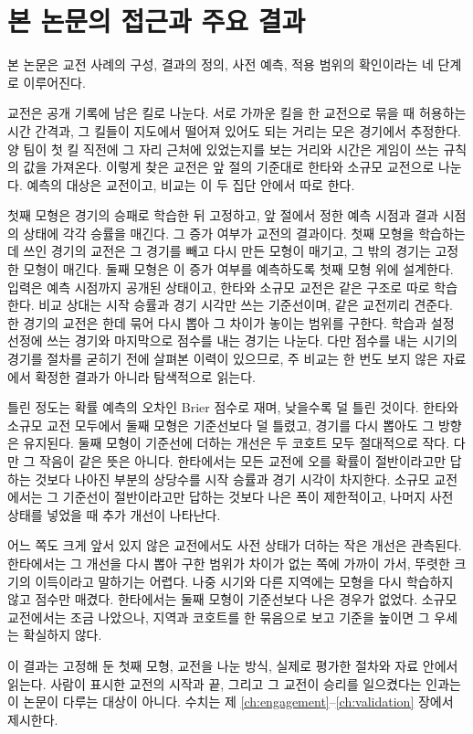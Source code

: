 \section{본 논문의 접근과 주요 결과}
\label{sec:intro-approach}

본 논문은 교전 사례의 구성, 결과의 정의, 사전 예측, 적용 범위의 확인이라는 네 단계로 이루어진다.

교전은 공개 기록에 남은 킬로 나눈다. 서로 가까운 킬을 한 교전으로 묶을 때 허용하는 시간 간격과, 그 킬들이 지도에서 떨어져 있어도 되는 거리는 모은 경기에서 추정한다. 양 팀이 첫 킬 직전에 그 자리 근처에 있었는지를 보는 거리와 시간은 게임이 쓰는 규칙의 값을 가져온다. 이렇게 찾은 교전은 앞 절의 기준대로 한타와 소규모 교전으로 나눈다. 예측의 대상은 교전이고, 비교는 이 두 집단 안에서 따로 한다.

첫째 모형은 경기의 승패로 학습한 뒤 고정하고, 앞 절에서 정한 예측 시점과 결과 시점의 상태에 각각 승률을 매긴다. 그 증가 여부가 교전의 결과이다. 첫째 모형을 학습하는 데 쓰인 경기의 교전은 그 경기를 빼고 다시 만든 모형이 매기고, 그 밖의 경기는 고정한 모형이 매긴다. 둘째 모형은 이 증가 여부를 예측하도록 첫째 모형 위에 설계한다. 입력은 예측 시점까지 공개된 상태이고, 한타와 소규모 교전은 같은 구조로 따로 학습한다. 비교 상대는 시작 승률과 경기 시각만 쓰는 기준선이며, 같은 교전끼리 견준다. 한 경기의 교전은 한데 묶어 다시 뽑아 그 차이가 놓이는 범위를 구한다. 학습과 설정 선정에 쓰는 경기와 마지막으로 점수를 내는 경기는 나눈다. 다만 점수를 내는 시기의 경기를 절차를 굳히기 전에 살펴본 이력이 있으므로, 주 비교는 한 번도 보지 않은 자료에서 확정한 결과가 아니라 탐색적으로 읽는다.

틀린 정도는 확률 예측의 오차인 Brier 점수로 재며, 낮을수록 덜 틀린 것이다. 한타와 소규모 교전 모두에서 둘째 모형은 기준선보다 덜 틀렸고, 경기를 다시 뽑아도 그 방향은 유지된다. 둘째 모형이 기준선에 더하는 개선은 두 코호트 모두 절대적으로 작다. 다만 그 작음이 같은 뜻은 아니다. 한타에서는 모든 교전에 오를 확률이 절반이라고만 답하는 것보다 나아진 부분의 상당수를 시작 승률과 경기 시각이 차지한다. 소규모 교전에서는 그 기준선이 절반이라고만 답하는 것보다 나은 폭이 제한적이고, 나머지 사전 상태를 넣었을 때 추가 개선이 나타난다.

어느 쪽도 크게 앞서 있지 않은 교전에서도 사전 상태가 더하는 작은 개선은 관측된다. 한타에서는 그 개선을 다시 뽑아 구한 범위가 차이가 없는 쪽에 가까이 가서, 뚜렷한 크기의 이득이라고 말하기는 어렵다. 나중 시기와 다른 지역에는 모형을 다시 학습하지 않고 점수만 매겼다. 한타에서는 둘째 모형이 기준선보다 나은 경우가 없었다. 소규모 교전에서는 조금 나았으나, 지역과 코호트를 한 묶음으로 보고 기준을 높이면 그 우세는 확실하지 않다.

이 결과는 고정해 둔 첫째 모형, 교전을 나눈 방식, 실제로 평가한 절차와 자료 안에서 읽는다. 사람이 표시한 교전의 시작과 끝, 그리고 그 교전이 승리를 일으켰다는 인과는 이 논문이 다루는 대상이 아니다. 수치는 제 \ref{ch:engagement}--\ref{ch:validation} 장에서 제시한다.
